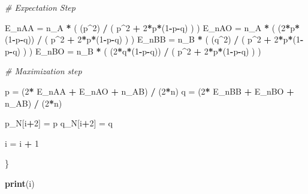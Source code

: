 \documentclass[]{article}
\newenvironment{Shaded}{\begin{snugshade}}{\end{snugshade}}
\newcommand{\KeywordTok}[1]{\textcolor[rgb]{0.13,0.29,0.53}{\textbf{#1}}}
\newcommand{\DecValTok}[1]{\textcolor[rgb]{0.00,0.00,0.81}{#1}}
\newcommand{\StringTok}[1]{\textcolor[rgb]{0.31,0.60,0.02}{#1}}
\newcommand{\CommentTok}[1]{\textcolor[rgb]{0.56,0.35,0.01}{\textit{#1}}}
\newcommand{\OperatorTok}[1]{\textcolor[rgb]{0.81,0.36,0.00}{\textbf{#1}}}
\newcommand{\NormalTok}[1]{#1}
\begin{document}
\begin{Shaded}
\begin{Highlighting}[]
        \CommentTok{# Expectation Step}
      
\NormalTok{        E_nAA =}\StringTok{ }\NormalTok{n_A }\OperatorTok{*}\StringTok{ }\NormalTok{( (p}\OperatorTok{^}\DecValTok{2}\NormalTok{) }\OperatorTok{/}\StringTok{ }\NormalTok{( p}\OperatorTok{^}\DecValTok{2} \OperatorTok{+}\StringTok{ }\DecValTok{2}\OperatorTok{*}\NormalTok{p}\OperatorTok{*}\NormalTok{(}\DecValTok{1}\OperatorTok{-}\NormalTok{p}\OperatorTok{-}\NormalTok{q) ) )}
\NormalTok{        E_nAO =}\StringTok{ }\NormalTok{n_A }\OperatorTok{*}\StringTok{ }\NormalTok{( (}\DecValTok{2}\OperatorTok{*}\NormalTok{p}\OperatorTok{*}\NormalTok{(}\DecValTok{1}\OperatorTok{-}\NormalTok{p}\OperatorTok{-}\NormalTok{q)) }\OperatorTok{/}\StringTok{ }\NormalTok{( p}\OperatorTok{^}\DecValTok{2} \OperatorTok{+}\StringTok{ }\DecValTok{2}\OperatorTok{*}\NormalTok{p}\OperatorTok{*}\NormalTok{(}\DecValTok{1}\OperatorTok{-}\NormalTok{p}\OperatorTok{-}\NormalTok{q) ) )}
\NormalTok{        E_nBB =}\StringTok{ }\NormalTok{n_B }\OperatorTok{*}\StringTok{ }\NormalTok{( (q}\OperatorTok{^}\DecValTok{2}\NormalTok{) }\OperatorTok{/}\StringTok{ }\NormalTok{( p}\OperatorTok{^}\DecValTok{2} \OperatorTok{+}\StringTok{ }\DecValTok{2}\OperatorTok{*}\NormalTok{p}\OperatorTok{*}\NormalTok{(}\DecValTok{1}\OperatorTok{-}\NormalTok{p}\OperatorTok{-}\NormalTok{q) ) )}
\NormalTok{        E_nBO =}\StringTok{ }\NormalTok{n_B }\OperatorTok{*}\StringTok{ }\NormalTok{( (}\DecValTok{2}\OperatorTok{*}\NormalTok{q}\OperatorTok{*}\NormalTok{(}\DecValTok{1}\OperatorTok{-}\NormalTok{p}\OperatorTok{-}\NormalTok{q)) }\OperatorTok{/}\StringTok{ }\NormalTok{( p}\OperatorTok{^}\DecValTok{2} \OperatorTok{+}\StringTok{ }\DecValTok{2}\OperatorTok{*}\NormalTok{p}\OperatorTok{*}\NormalTok{(}\DecValTok{1}\OperatorTok{-}\NormalTok{p}\OperatorTok{-}\NormalTok{q) ) )}
        
        \CommentTok{# Maximization step}
        
\NormalTok{        p =}\StringTok{ }\NormalTok{(}\DecValTok{2}\OperatorTok{*}\StringTok{ }\NormalTok{E_nAA }\OperatorTok{+}\StringTok{ }\NormalTok{E_nAO }\OperatorTok{+}\StringTok{ }\NormalTok{n_AB) }\OperatorTok{/}\StringTok{ }\NormalTok{(}\DecValTok{2}\OperatorTok{*}\NormalTok{n) }
\NormalTok{        q =}\StringTok{ }\NormalTok{(}\DecValTok{2}\OperatorTok{*}\StringTok{ }\NormalTok{E_nBB }\OperatorTok{+}\StringTok{ }\NormalTok{E_nBO }\OperatorTok{+}\StringTok{ }\NormalTok{n_AB) }\OperatorTok{/}\StringTok{ }\NormalTok{(}\DecValTok{2}\OperatorTok{*}\NormalTok{n)}
        
\NormalTok{        p_N[i}\OperatorTok{+}\DecValTok{2}\NormalTok{] =}\StringTok{ }\NormalTok{p}
\NormalTok{        q_N[i}\OperatorTok{+}\DecValTok{2}\NormalTok{] =}\StringTok{ }\NormalTok{q}
      
\NormalTok{        i =}\StringTok{ }\NormalTok{i }\OperatorTok{+}\StringTok{ }\DecValTok{1}
  
\NormalTok{\}}

\KeywordTok{print}\NormalTok{(i)}
\end{Highlighting}
\end{Shaded}
\end{document}
